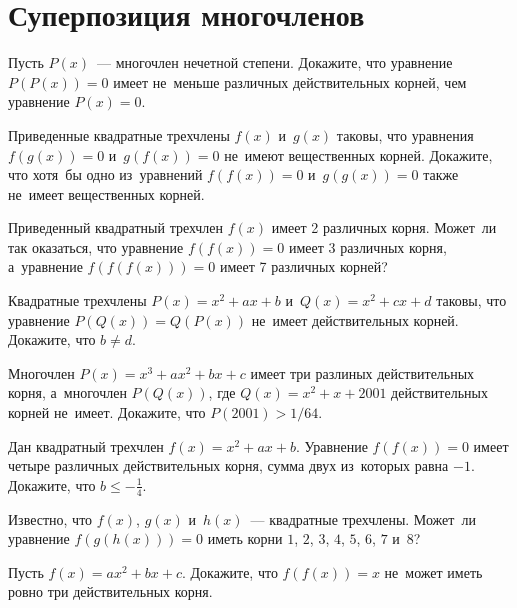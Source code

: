 
\section*{Суперпозиция многочленов}


\begin{problems}

\item
Пусть $P(x)$~--- многочлен нечетной степени.
Докажите, что уравнение $P(P(x)) = 0$ имеет не~меньше различных действительных
корней, чем уравнение $P(x) = 0$.

\item
Приведенные квадратные трехчлены $f(x)$ и~$g(x)$ таковы, что уравнения
$f(g(x)) = 0$ и~$g(f(x)) = 0$ не~имеют вещественных корней.
Докажите, что хотя~бы одно из~уравнений $f(f(x)) = 0$ и~$g(g(x)) = 0$ также
не~имеет вещественных корней.

\item
Приведенный квадратный трехчлен $f(x)$ имеет 2 различных корня.
Может~ли так оказаться, что уравнение $f(f(x)) = 0$ имеет 3 различных корня,
а~уравнение
\(
    f(f(f(x))) = 0
\)
имеет 7 различных корней?

\item
Квадратные трехчлены $P(x) = x^2 + a x + b$ и~$Q(x) = x^2 + c x + d$ таковы,
что уравнение $P(Q(x)) = Q(P(x))$ не~имеет действительных корней.
Докажите, что $b \neq d$.

\item
Многочлен $P(x) = x^3 + a x^2 + b x + c$ имеет три разлиных действительных
корня, а~многочлен $P(Q(x))$, где $Q(x) = x^2 + x + 2001$ действительных корней
не~имеет.
Докажите, что $P(2001) > 1 / 64$.

\item
Дан квадратный трехчлен $f(x) = x^2 + a x + b$.
Уравнение $f(f(x)) = 0$ имеет четыре различных действительных корня, сумма двух
из~которых равна $-1$.
Докажите, что $b \leq -\frac{1}{4}$.

\item
Известно, что $f(x)$, $g(x)$ и~$h(x)$~--- квадратные трехчлены.
Может~ли уравнение
\(
    f(g(h(x))) = 0
\)
иметь корни $1$, $2$, $3$, $4$, $5$, $6$, $7$ и~$8$?

\item
Пусть $f(x) = a x^2 + b x + c$.
Докажите, что $f(f(x)) = x$ не~может иметь ровно три действительных корня.

\end{problems}

